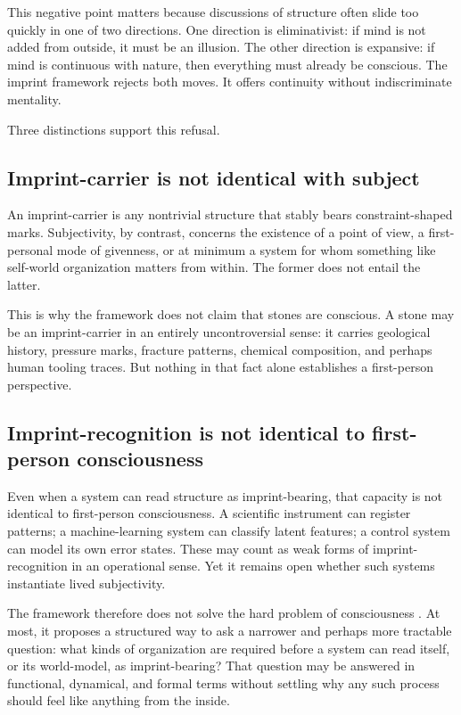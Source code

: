 \documentclass[12pt]{article}
\begin{document}
This negative point matters because discussions of structure often slide too quickly in one of two directions. One direction is eliminativist: if mind is not added from outside, it must be an illusion. The other direction is expansive: if mind is continuous with nature, then everything must already be conscious. The imprint framework rejects both moves. It offers continuity without indiscriminate mentality.

Three distinctions support this refusal.

\subsection{Imprint-carrier is not identical with subject}

An imprint-carrier is any nontrivial structure that stably bears constraint-shaped marks. Subjectivity, by contrast, concerns the existence of a point of view, a first-personal mode of givenness, or at minimum a system for whom something like self-world organization matters from within. The former does not entail the latter.

This is why the framework does not claim that stones are conscious. A stone may be an imprint-carrier in an entirely uncontroversial sense: it carries geological history, pressure marks, fracture patterns, chemical composition, and perhaps human tooling traces. But nothing in that fact alone establishes a first-person perspective.

\subsection{Imprint-recognition is not identical to first-person consciousness}

Even when a system can read structure as imprint-bearing, that capacity is not identical to first-person consciousness. A scientific instrument can register patterns; a machine-learning system can classify latent features; a control system can model its own error states. These may count as weak forms of imprint-recognition in an operational sense. Yet it remains open whether such systems instantiate lived subjectivity.

The framework therefore does not solve the hard problem of consciousness \cite{Levine1983,Chalmers1996}. At most, it proposes a structured way to ask a narrower and perhaps more tractable question: what kinds of organization are required before a system can read itself, or its world-model, as imprint-bearing? That question may be answered in functional, dynamical, and formal terms without settling why any such process should feel like anything from the inside.
\end{document}
